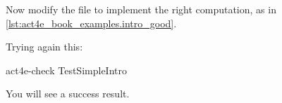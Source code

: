 Now modify the file to implement the right computation, as in  \cref{lst:act4e_book_examples.intro_good}.

\begin{longcode}
    \caption{}
    \label{lst:act4e_book_examples.intro_good}
\end{longcode}

Trying again this:

\begin{console}
    act4e-check TestSimpleIntro
\end{console}

You will see a success result.

